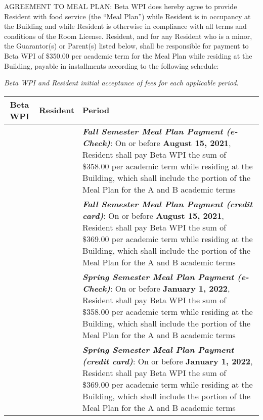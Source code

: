 \documentclass[12pt]{article}
\begin{document}
\begin{enumerate}
AGREEMENT TO MEAL PLAN\@: Beta WPI does hereby agree to provide Resident with food service (the ``Meal Plan'') while Resident is in occupancy at the Building and while Resident is otherwise in compliance with all terms and conditions of the Room License.
Resident, and for any Resident who is a minor, the Guarantor(s) or Parent(s) listed below, shall be responsible for payment to Beta WPI of \$350.00 per academic term for the Meal Plan while residing at the Building, payable in installments according to the following schedule:

\begin{minipage}{\textwidth}
\textit{Beta WPI and Resident initial acceptance of fees for each applicable period}.

\begin{tabular}{|c|c|p{4in}|} \toprule
        Beta WPI & Resident & Period \\ \midrule
                 & & \textbf{\textit{Fall Semester Meal Plan Payment (e-Check)}}: On or before \textbf{August 15, 2021}, Resident shall pay Beta WPI the sum of \$358.00 per academic term while residing at the Building, which shall include the portion of the Meal Plan for the A and B academic terms\\ \midrule
                 & & \textbf{\textit{Fall Semester Meal Plan Payment (credit card)}}: On or before \textbf{August 15, 2021}, Resident shall pay Beta WPI the sum of \$369.00 per academic term while residing at the Building, which shall include the portion of the Meal Plan for the A and B academic terms\\ \midrule
                 & & \textbf{\textit{Spring Semester Meal Plan Payment (e-Check)}}: On or before \textbf{January 1, 2022}, Resident shall pay Beta WPI the sum of \$358.00 per academic term while residing at the Building, which shall include the portion of the Meal Plan for the A and B academic terms\\ \midrule
                 & & \textbf{\textit{Spring Semester Meal Plan Payment (credit card)}}: On or before \textbf{January 1, 2022}, Resident shall pay Beta WPI the sum of \$369.00 per academic term while residing at the Building, which shall include the portion of the Meal Plan for the A and B academic terms\\ \midrule
\end{tabular}
\end{minipage}

\begin{enumerate}[label=\Alph*.]


\end{enumerate}
\end{enumerate}
\end{document}

